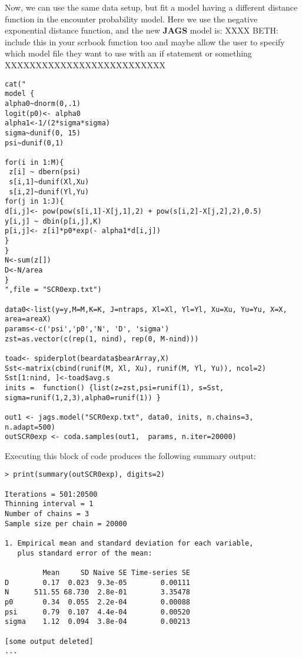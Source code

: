 Now, we can use the same data setup, but fit a model having a
different distance function in the encounter probability model. Here
we use the negative exponential distance function, and the new
{\bf JAGS} model is:  XXXX BETH: include this in your scrbook
 function too and maybe allow the user to specify which model file
 they want to use with an if statement or something XXXXXXXXXXXXXXXXXXXXXXXXXX
{\small
\begin{verbatim}
cat("
model {
alpha0~dnorm(0,.1)
logit(p0)<- alpha0
alpha1<-1/(2*sigma*sigma)
sigma~dunif(0, 15)
psi~dunif(0,1)

for(i in 1:M){
 z[i] ~ dbern(psi)
 s[i,1]~dunif(Xl,Xu)
 s[i,2]~dunif(Yl,Yu)
for(j in 1:J){
d[i,j]<- pow(pow(s[i,1]-X[j,1],2) + pow(s[i,2]-X[j,2],2),0.5)
y[i,j] ~ dbin(p[i,j],K)
p[i,j]<- z[i]*p0*exp(- alpha1*d[i,j])
}
}
N<-sum(z[])
D<-N/area
}
",file = "SCR0exp.txt")

data0<-list(y=y,M=M,K=K, J=ntraps, Xl=Xl, Yl=Yl, Xu=Xu, Yu=Yu, X=X, area=areaX)
params<-c('psi','p0','N', 'D', 'sigma')
zst=as.vector(c(rep(1, nind), rep(0, M-nind)))

toad<- spiderplot(beardata$bearArray,X)
Sst<-matrix(cbind(runif(M, Xl, Xu), runif(M, Yl, Yu)), ncol=2)
Sst[1:nind, ]<-toad$avg.s
inits =  function() {list(z=zst,psi=runif(1), s=Sst, sigma=runif(1,2,3),alpha0=runif(1)) }

out1 <- jags.model("SCR0exp.txt", data0, inits, n.chains=3, n.adapt=500)
outSCR0exp <- coda.samples(out1,  params, n.iter=20000)
\end{verbatim}
}
Executing this block of code produces the following summary output:
{\small
\begin{verbatim}
> print(summary(outSCR0exp), digits=2)

Iterations = 501:20500
Thinning interval = 1
Number of chains = 3
Sample size per chain = 20000

1. Empirical mean and standard deviation for each variable,
   plus standard error of the mean:

         Mean     SD Naive SE Time-series SE
D        0.17  0.023  9.3e-05        0.00111
N      511.55 68.730  2.8e-01        3.35478
p0       0.34  0.055  2.2e-04        0.00088
psi      0.79  0.107  4.4e-04        0.00520
sigma    1.12  0.094  3.8e-04        0.00213

[some output deleted]
...
\end{verbatim}
}


